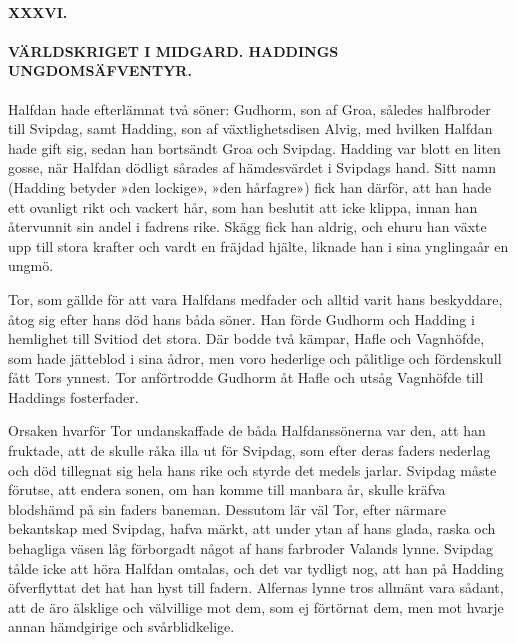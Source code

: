 \paragraph{XXXVI.}

\paragraph{VÄRLDSKRIGET I MIDGARD. HADDINGS UNGDOMSÄFVENTYR.}

Halfdan hade efterlämnat två söner: Gudhorm, son af Groa, således
halfbroder till Svipdag, samt Hadding, son af växtlighetsdisen Alvig,
med hvilken Halfdan hade gift sig, sedan han bortsändt Groa och Svipdag.
Hadding var blott en liten gosse, när Halfdan dödligt sårades af
hämdesvärdet i Svipdags hand. Sitt namn (Hadding betyder »den lockige»,
»den hårfagre») fick han därför, att han hade ett ovanligt rikt och
vackert hår, som han beslutit att icke klippa, innan han återvunnit sin
andel i fadrens rike. Skägg fick han aldrig, och ehuru han växte upp
till stora krafter och vardt en fräjdad hjälte, liknade han i sina
ynglingaår en ungmö.

Tor, som gällde för att vara Halfdans medfader och alltid varit hans
beskyddare, åtog sig efter hans död hans båda söner. Han förde Gudhorm
och Hadding i hemlighet till Svitiod det stora. Där bodde två kämpar,
Hafle och Vagnhöfde, som hade jätteblod i sina ådror, men voro hederlige
och pålitlige och fördenskull fått Tors ynnest. Tor anförtrodde Gudhorm
åt Hafle och utsåg Vagnhöfde till Haddings fosterfader.

Orsaken hvarför Tor undanskaffade de båda Halfdanssönerna var den, att
han fruktade, att de skulle råka illa ut för Svipdag, som efter deras
faders nederlag och död tillegnat sig hela hans rike och styrde det
medels jarlar. Svipdag måste förutse, att endera sonen, om han komme
till manbara år, skulle kräfva blodshämd på sin faders baneman. Dessutom
lär väl Tor, efter närmare bekantskap med Svipdag, hafva märkt, att
under ytan af hans glada, raska och behagliga väsen låg förborgadt något
af hans farbroder Valands lynne. Svipdag tålde icke att höra Halfdan
omtalas, och det var tydligt nog, att han på Hadding öfverflyttat det
hat han
\protect\hypertarget{lb1625905.xhtmlux5cux23start153}{}{}\protect\hypertarget{lb1625905.xhtmlux5cux23start153-a}{}{}\protect\hypertarget{lb1625905.xhtmlux5cux23start153-b}{}{}\protect\hypertarget{lb1625905.xhtmlux5cux23start153-c}{}{}\protect\hypertarget{lb1625905.xhtmlux5cux23start153-d}{}{}
hyst till fadern. Alfernas lynne tros allmänt vara sådant, att de äro
älsklige och välvillige mot dem, som ej förtörnat dem, men mot hvarje
annan hämdgirige och svårblidkelige.

